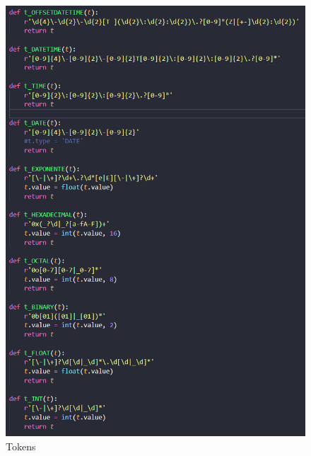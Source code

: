 \documentclass[a4paper]{report}
\begin{document}
\begin{figure}[H]
    \centering
    \includegraphics[scale=0.4]{imagens/l.png}
    \caption{Tokens}
    \label{fig:my_label}
\end{figure}
\end{document}
